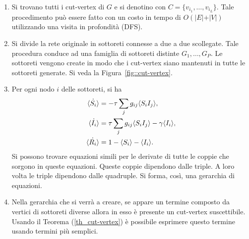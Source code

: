 \begin{enumerate}
	\item Si trovano tutti i cut-vertex di $G$ e si denotino con $C=\{ v_{i_1}, \dots, v_{i_L}\}$. Tale procedimento pu\`o essere fatto con  un costo in tempo di $O(\vert E \vert + \vert V \vert)$ utilizzando una visita in profondit\`a (DFS). 
	\item Si divide la rete originale in sottoreti connesse a due a due scollegate. Tale procedura conduce ad una famiglia di sottoreti distinte $G_1, \dots, G_P$. Le sottoreti vengono create in modo che i cut-vertex siano mantenuti in tutte le sottoreti generate. Si veda la Figura~\ref{fig::cut-vertex}.
	\item Per ogni nodo $i$ delle sottoreti, si ha 
	\begin{equation*}
	\begin{aligned}
\dot{\langle S_i \rangle} &= -\tau \sum_j g_{ij} \langle S_iI_j \rangle,\\
\dot{\langle I_i \rangle} &= \tau \sum_j g_{ij} \langle S_iI_j \rangle-\gamma\langle I_i \rangle,\\
\dot{\langle R_i \rangle} &= 1 -\langle S_i \rangle -\langle I_i \rangle.
		\end{aligned}
	\end{equation*}
	Si possono trovare  equazioni simili per le derivate di tutte le coppie che sorgono in queste equazioni. Queste coppie dipendono dalle triple. A loro volta le triple dipendono dalle quadruple. Si forma, cos\`i, una gerarchia di equazioni.
	\item Nella gerarchia che si verr\`a a creare, se appare un termine composto da  vertici di sottoreti diverse allora in esso \`e presente un cut-vertex suscettibile. Usando il Teorema (\ref{th_cut-vertex}) \`e possibile esprimere questo termine usando termini pi\`u semplici.
\end{enumerate}
\newpage
